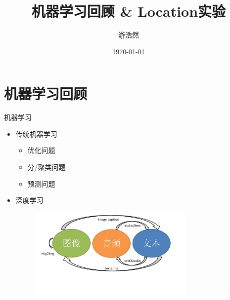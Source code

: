 \documentclass[aspectratio=43]{beamer}
\title{机器学习回顾 \& Location实验}
\author{游浩然 }
\institute[\bf HUST]{u201515429@hust.edu.cn}
\date{\today}
\begin{document}
\begin{frame}
  \titlepage
\end{frame}




\section{机器学习回顾}
\begin{frame}{机器学习}
\begin{itemize}
  \item 传统机器学习
  \begin{itemize}
    \item 优化问题
    \item 分/聚类问题
    \item 预测问题
  \end{itemize}
  \item 深度学习
  \begin{figure}[!htbp]
    \centering
    \includegraphics[width=8cm]{dl.pdf}
  \end{figure}
\end{itemize}
\end{frame}
\end{document}
